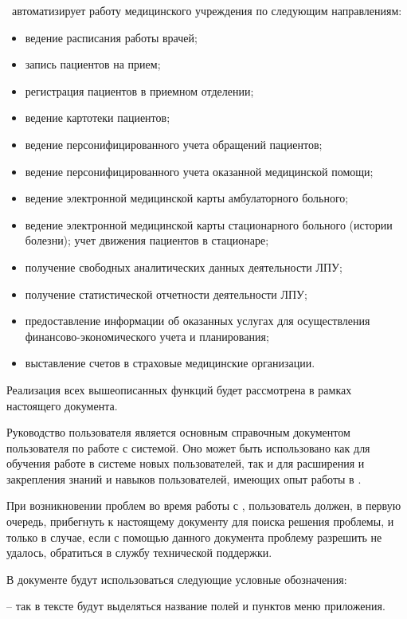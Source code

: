 \tmis~автоматизирует работу медицинского учреждения по следующим направлениям:
\begin{itemize}
 	\item ведение расписания работы врачей;
 	\item запись пациентов на прием;
 	\item регистрация пациентов в приемном отделении;
 	\item ведение картотеки пациентов;
 	\item ведение персонифицированного учета обращений пациентов;
 	\item ведение персонифицированного учета оказанной медицинской помощи;
 	\item ведение электронной медицинской карты амбулаторного больного;
 	\item ведение электронной медицинской карты стационарного больного (истории болезни);
 	учет движения пациентов в стационаре;
    \item получение свободных аналитических данных деятельности ЛПУ;
 	\item получение статистической отчетности деятельности ЛПУ;
 	\item предоставление информации об оказанных услугах для осуществления финансово-экономического учета и планирования;
 	\item выставление счетов в страховые медицинские организации.
\end{itemize}

Реализация всех вышеописанных функций будет рассмотрена в рамках настоящего документа.

\newpage
{}

 Руководство пользователя является основным справочным документом пользователя по работе с системой. Оно может быть использовано как для обучения работе в системе новых пользователей, так и для расширения и закрепления знаний и навыков пользователей, имеющих опыт работы в \tmis .

 При возникновении проблем во время работы с \tmis , пользователь должен, в первую очередь, прибегнуть к настоящему документу для поиска решения проблемы, и только в случае, если с помощью данного документа проблему разрешить не удалось, обратиться в службу технической поддержки.

 В документе будут использоваться следующие условные обозначения:  \vspace*{0.5em}
 
  -- так в тексте будут выделяться название полей и пунктов меню приложения.
 
